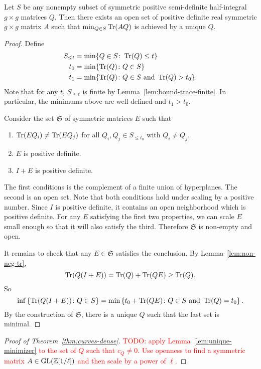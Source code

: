 \documentclass{amsart}
\begin{document}
\begin{lemma}\label{lem:unique-minimizer}
  Let $S$ be any nonempty subset of symmetric positive semi-definite half-integral $g \times g$ matrices $Q$. Then there exists an open set of positive definite real symmetric $g \times g$ matrix $A$ such that $\min_{Q \in S}\operatorname{Tr}(AQ)$ is achieved by a unique $Q$.
\end{lemma}
\begin{proof}
  Define
  \begin{align*}
    S_{\leq t} &= \min\{ Q \in S \colon \operatorname{Tr}(Q) \leq t \}
    \\
    t_0 &= \min\{ \operatorname{Tr}(Q) \colon Q \in S \}
    \\
    t_1 &= \min\{ \operatorname{Tr}(Q) \colon Q \in S \text{ and } \operatorname{Tr}(Q) > t_0 \}.
  \end{align*}
  Note that for any $t$, $S_{\leq t}$ is finite by Lemma~\ref{lem:bound-trace-finite}. In particular, the minimums above are well defined and $t_1 > t_0$.

  Consider the set $\mathfrak{S}$ of symmetric matrices $E$ such that
  \begin{enumerate}
    \item $\operatorname{Tr}(EQ_i) \neq \operatorname{Tr}(EQ_j)$ for all $Q_i,Q_j \in S_{\leq t_0}$ with $Q_i \neq Q_j$.
    \item $E$ is positive definite.
    \item $I + E$ is positive definite.
  \end{enumerate}

  The first conditions is the complement of a finite union of hyperplanes. The second is an open set. Note that both conditions hold under scaling by a positive number. Since $I$ is positive definite, it contains an open neighborhood which is positive definite. For any $E$ satisfying the first two properties, we can scale $E$ small enough so that it will also satisfy the third. Therefore $\mathfrak{S}$ is non-empty and open.

  It remains to check that any $E \in \mathfrak{S}$ satisfies the conclusion. By Lemma~\ref{lem:non-neg-tr},
  \[
    \operatorname{Tr}(Q(I + E)) = \operatorname{Tr}(Q) + \operatorname{Tr}(QE) \geq \operatorname{Tr}(Q).
  \]
  So
  \[
    \inf\left\{ \operatorname{Tr}(Q(I+E)) \colon Q \in S \right\}
    =
    \min\left\{ t_0 + \operatorname{Tr}(QE) \colon Q \in S \text{ and } \operatorname{Tr}(Q) = t_0 \right\}.
  \]
  By the construction of $\mathfrak{S}$, there is a unique $Q$ such that the last set is minimal.
\end{proof}

\begin{proof}[Proof of Theorem~\ref{thm:curves-dense}]
  \textcolor{red}{TODO: apply Lemma~\ref{lem:unique-minimizer} to the set of $Q$ such that $c_Q \neq 0$. Use openness to find a symmetric matrix $A \in \operatorname{GL}(\mathbb{Z}[1/\ell])$ and then scale by a power of $\ell$.}
\end{proof}
\end{document}
